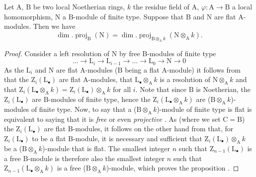 \begin{proposition}[6.2.3]
\label{IV.6.2.3}
Let $\mathrm{A}$, $\mathrm{B}$ be two local Noetherian rings, $k$ the residue field of $\mathrm{A}$, $\varphi:\mathrm{A}\to\mathrm{B}$ a local homomorphism, $\mathrm{N}$ a $\mathrm{B}$-module of finite type.
Suppose that $\mathrm{B}$ and $\mathrm{N}$ are flat $\mathrm{A}$-modules.
Then we have
\begin{equation}
  \dim.\operatorname{proj}_\mathrm{B}(\mathrm{N})=\dim.\operatorname{proj}_{\mathrm{B}\otimes_\mathrm{A} k}(\mathrm{N}\otimes_\mathrm{A} k).
  \tag{6.2.3.1}
\end{equation}
\end{proposition}

\begin{proof}
Consider a left resolution of $\mathrm{N}$ by free $\mathrm{B}$-modules of finite type
\[
  \ldots\to\mathrm{L}_i\to\mathrm{L}_{i-1}\to\ldots\to\mathrm{L}_0\to\mathrm{N}\to 0
\]
As the $\mathrm{L}_i$ and $\mathrm{N}$ are flat $\mathrm{A}$-modules ($\mathrm{B}$ being a flat $\mathrm{A}$-module) it follows from  that the $\mathrm{Z}_i(\mathrm{L}_\bullet)$ are flat $\mathrm{A}$-modules, that $\mathrm{L}_\bullet\otimes_\mathrm{A} k$ is a resolution of $\mathrm{N}\otimes_\mathrm{A} k$ and that $\mathrm{Z}_i(\mathrm{L}_\bullet\otimes_\mathrm{A} k)=\mathrm{Z}_i(\mathrm{L}_\bullet)\otimes_\mathrm{A} k$ for all $i$.
Note that since $\mathrm{B}$ is Noetherian, the $\mathrm{Z}_i(\mathrm{L}_\bullet)$ are $\mathrm{B}$-modules of finite type, hence the $\mathrm{Z}_i(\mathrm{L}_\bullet\otimes_\mathrm{A} k)$ are ($\mathrm{B}\otimes_\mathrm{A} k$)-modules of finite type.
Now, to say that a ($\mathrm{B}\otimes_\mathrm{A} k$)-module of finite type is flat is equivalent to saying that it is \emph{free} or even \emph{projective} .
As (where we set $\mathrm{C}=\mathrm{B}$) the $\mathrm{Z}_i(\mathrm{L}_\bullet)$ are flat $\mathrm{B}$-modules, it follows on the other hand from  that, for $\mathrm{Z}_i(\mathrm{L}_\bullet)$ to be a flat $\mathrm{B}$-module, it is necessary and sufficient that $\mathrm{Z}_i(\mathrm{L}_\bullet)\otimes_\mathrm{A} k$ be a ($\mathrm{B}\otimes_\mathrm{A} k$)-module that is flat.
The smallest integer $n$ such that $\mathrm{Z}_{n-1}(\mathrm{L}_\bullet)$ is a free $\mathrm{B}$-module is therefore also the smallest integer $n$ such that $\mathrm{Z}_{n-1}(\mathrm{L}_\bullet\otimes_\mathrm{A} k)$ is a free ($\mathrm{B}\otimes_\mathrm{A} k$)-module, which proves the proposition .
\end{proof}

